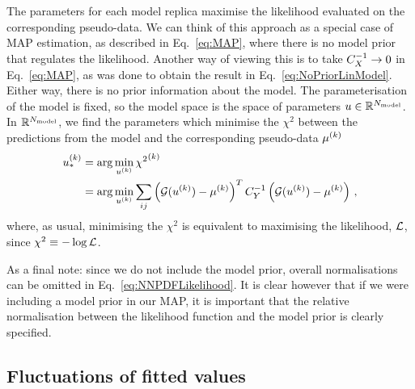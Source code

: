 The parameters for each model replica maximise the likelihood evaluated on the
corresponding pseudo-data. We can think of this approach as a special case of
MAP estimation, as described in Eq.~\eqref{eq:MAP}, where there is no model
prior that regulates the likelihood. Another way of viewing this is to take
$C_X^{-1} \to 0$ in Eq.~\eqref{eq:MAP}, as was done to obtain the
result in Eq.~\ref{eq:NoPriorLinModel}. Either way, there is no prior
information about the model. The parameterisation of the model is fixed, so the
model space is the space of parameters $u \in \mathbb{R}^{N_{\rm model}}$.
In $\mathbb{R}^{N_{\rm model}}$, we find the parameters which minimise the $\chi^2$ between
the predictions from the model and the corresponding pseudo-data
$\mu^{(k)}$
\begin{equation}\label{eq:NNPDFLikelihood}
    \begin{split}
        u_*^{(k)} &= \arg\min_{u^{(k)}} {\chi^2}^{(k)} \\
        &= \arg\min_{u^{(k)}} \sum_{ij}
        \left( \mathcal{G}(u^{(k)}) - \mu^{(k)} \right)^T
        C_{Y}^{-1}
        \left( \mathcal{G}(u^{(k)}) - \mu^{(k)} \right) \, ,
    \end{split}
\end{equation}
where, as usual, minimising the $\chi^2$ is equivalent to maximising the
likelihood, $\mathcal{L}$, since $\chi^2 \equiv -\log{\mathcal{L}}$.

As a final note: since we do not include the model prior, overall normalisations
can be omitted in Eq.~\ref{eq:NNPDFLikelihood}. It is clear however that if we
were including a model prior in our MAP, it is important that the relative
normalisation between the likelihood function and the model prior is clearly
specified.

\subsection{Fluctuations of fitted values}
\label{sec:fluct-fit-values}

